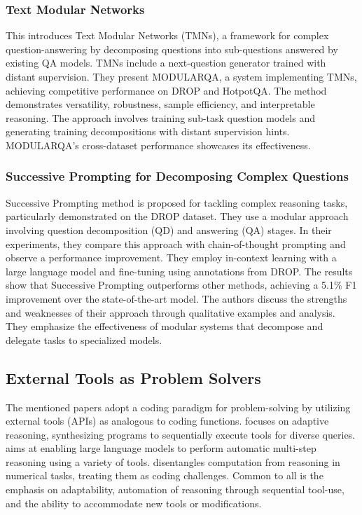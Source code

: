 \documentclass[10pt,twocolumn,letterpaper]{article}
\begin{document}
\subsubsection{Text Modular Networks \cite{khot2021text}}
This introduces Text Modular Networks (TMNs), a framework for complex question-answering by decomposing questions into sub-questions answered by existing QA models. TMNs include a next-question generator trained with distant supervision. They present MODULARQA, a system implementing TMNs, achieving competitive performance on DROP and HotpotQA. The method demonstrates versatility, robustness, sample efficiency, and interpretable reasoning. The approach involves training sub-task question models and generating training decompositions with distant supervision hints. MODULARQA's cross-dataset performance showcases its effectiveness.
\subsubsection{Successive Prompting for Decomposing Complex Questions \cite{dua2022successive}}
Successive Prompting method is proposed for tackling complex reasoning tasks, particularly demonstrated on the DROP dataset. They use a modular approach involving question decomposition (QD) and answering (QA) stages. In their experiments, they compare this approach with chain-of-thought prompting and observe a performance improvement. They employ in-context learning with a large language model and fine-tuning using annotations from DROP. The results show that Successive Prompting outperforms other methods, achieving a 5.1\% F1 improvement over the state-of-the-art model. The authors discuss the strengths and weaknesses of their approach through qualitative examples and analysis. They emphasize the effectiveness of modular systems that decompose and delegate tasks to specialized models.

\subsection{External Tools as Problem Solvers}
The mentioned papers adopt a coding paradigm for problem-solving by utilizing external tools (APIs) as analogous to coding functions. \cite{lu2023chameleon} focuses on adaptive reasoning, synthesizing programs to sequentially execute tools for diverse queries. \cite{paranjape2023art} aims at enabling large language models to perform automatic multi-step reasoning using a variety of tools. \cite{chen2023program} disentangles computation from reasoning in numerical tasks, treating them as coding challenges. Common to all is the emphasis on adaptability, automation of reasoning through sequential tool-use, and the ability to accommodate new tools or modifications.
\end{document}
